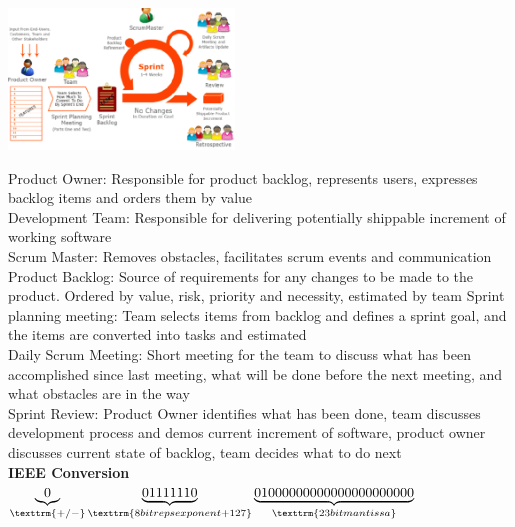 \documentclass{article}
\begin{document}
\includegraphics[width=6cm,height =4.5cm]{scrum.png}\\
Product Owner: Responsible for product backlog, represents users, expresses backlog items and orders them by value \\
Development Team: Responsible for delivering potentially shippable increment of working software \\
Scrum Master: Removes obstacles, facilitates scrum events and communication \\
Product Backlog: Source of requirements for any changes to be made to the product. Ordered by value, risk, priority and necessity, estimated by team
Sprint planning meeting: Team selects items from backlog and defines a sprint goal, and the items are converted into tasks and estimated \\
Daily Scrum Meeting: Short meeting for the team to discuss what has been accomplished since last meeting, what will be done before the next meeting, and what obstacles are in the way \\
Sprint Review: Product Owner identifies what has been done, team discusses development process and demos current increment of software, product owner discusses current state of backlog, team decides what to do next \\

\textbf{IEEE Conversion}\\
   $ \underbrace{0}_\texttrm{+/-}  \underbrace{01111110}_\texttrm{8 bit reps exponent + 127}  \underbrace{01000000000000000000000}_\texttrm{23 bit mantissa}$\\
\end{document}
